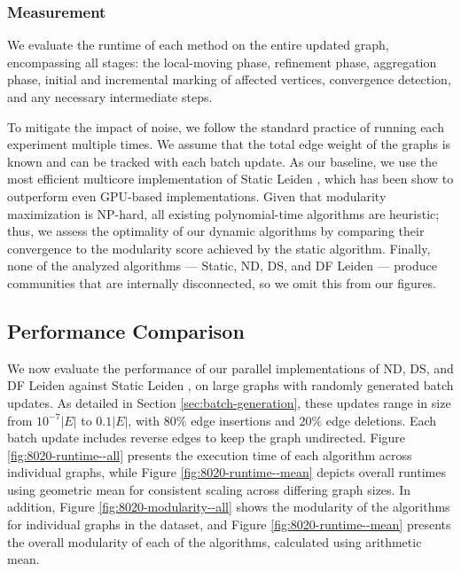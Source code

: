 \subsubsection{Measurement}
\label{sec:measurement}

We evaluate the runtime of each method on the entire updated graph, encompassing all stages: the local-moving phase, refinement phase, aggregation phase, initial and incremental marking of affected vertices, convergence detection, and any necessary intermediate steps. To mitigate the impact of noise, we follow the standard practice of running each experiment multiple times. We assume that the total edge weight of the graphs is known and can be tracked with each batch update. As our baseline, we use the most efficient multicore implementation of Static Leiden \cite{sahu2024fast}, which has been show to outperform even GPU-based implementations. Given that modularity maximization is NP-hard, all existing polynomial-time algorithms are heuristic; thus, we assess the optimality of our dynamic algorithms by comparing their convergence to the modularity score achieved by the static algorithm. Finally, none of the analyzed algorithms --- Static, ND, DS, and DF Leiden --- produce communities that are internally disconnected, so we omit this from our figures.



% 




\subsection{Performance Comparison}
\label{sec:performance-comparison}

We now evaluate the performance of our parallel implementations of ND, DS, and DF Leiden against Static Leiden \cite{sahu2024fast}, on large graphs with randomly generated batch updates. As detailed in Section \ref{sec:batch-generation}, these updates range in size from $10^{-7}|E|$ to $0.1|E|$, with $80\%$ edge insertions and $20\%$ edge deletions. Each batch update includes reverse edges to keep the graph undirected. Figure \ref{fig:8020-runtime--all} presents the execution time of each algorithm across individual graphs, while Figure \ref{fig:8020-runtime--mean} depicts overall runtimes using geometric mean for consistent scaling across differing graph sizes. In addition, Figure \ref{fig:8020-modularity--all} shows the modularity of the algorithms for individual graphs in the dataset, and Figure \ref{fig:8020-runtime--mean} presents the overall modularity of each of the algorithms, calculated using arithmetic mean.

